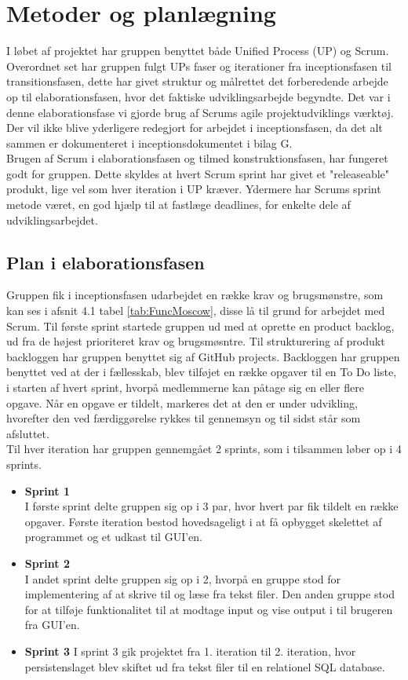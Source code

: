 \section{Metoder og planlægning}
I løbet af projektet har gruppen benyttet både Unified Process (UP) og Scrum. Overordnet set har gruppen fulgt UPs faser og iterationer fra inceptionsfasen til transitionsfasen, dette har givet struktur og målrettet det forberedende arbejde op til elaborationsfasen, hvor det faktiske udviklingsarbejde begyndte. Det var i denne elaborationsfase vi gjorde brug af Scrums agile projektudviklings værktøj. 
Der vil ikke blive yderligere redegjort for arbejdet i inceptionsfasen, da det alt sammen er dokumenteret i inceptionsdokumentet i bilag G.  \\
Brugen af Scrum i elaborationsfasen og tilmed konstruktionsfasen, har fungeret godt for gruppen. Dette skyldes at hvert Scrum sprint har givet et "releaseable" produkt, lige vel som hver iteration i UP kræver. Ydermere har Scrums sprint metode været, en god hjælp til at fastlæge deadlines, for enkelte dele af udviklingsarbejdet.

\subsection{Plan i elaborationsfasen}
Gruppen fik i inceptionsfasen udarbejdet en række krav og brugsmønstre, som kan ses i afsnit 4.1 tabel \ref{tab:FuncMoscow}, disse lå til grund for arbejdet med Scrum. Til første sprint startede gruppen ud med at oprette en product backlog, ud fra de højest prioriteret krav og brugsmøsntre. Til strukturering af produkt backloggen har gruppen benyttet sig af GitHub projects. Backloggen har gruppen benyttet ved at der i fællesskab, blev tilføjet en række opgaver til en To Do liste, i starten af hvert sprint, hvorpå medlemmerne kan påtage sig en eller flere opgave. Når en opgave er tildelt, markeres det at den er under udvikling, hvorefter den ved færdiggørelse rykkes til gennemsyn og til sidst står som afsluttet. \\
Til hver iteration har gruppen gennemgået 2 sprints, som i tilsammen løber op i 4 sprints. 
\begin{itemize}
    \item \textbf{Sprint 1} \\
    I første sprint delte gruppen sig op i 3 par, hvor hvert par fik tildelt en række opgaver. Første iteration bestod hovedsageligt i at få opbygget skelettet af programmet og et udkast til GUI'en.
    \item \textbf{Sprint 2} \\
    I andet sprint delte gruppen sig op i 2, hvorpå en gruppe stod for implementering af at skrive til og læse fra tekst filer. Den anden gruppe stod for at tilføje funktionalitet til at modtage input og vise output i til brugeren fra GUI'en.
    \item \textbf{Sprint 3}
    I sprint 3 gik projektet fra 1. iteration til 2. iteration, hvor persistenslaget blev skiftet ud fra tekst filer til en relationel SQL database. 
\end{itemize}